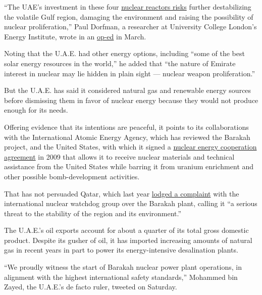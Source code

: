 ``The UAE's investment in these four
\href{https://www.nuclearconsult.com/wp/wp-content/uploads/2019/12/Gulf-Nuclear-Ambition-NCG-Dec-2019.pdf}{nuclear
reactors risks} further destabilizing the volatile Gulf region, damaging
the environment and raising the possibility of nuclear proliferation,''
Paul Dorfman, a researcher at University College London's Energy
Institute, wrote in an
\href{https://www.ucl.ac.uk/news/2020/mar/opinion-why-uae-about-open-four-nuclear-reactors}{op-ed}
in March.

Noting that the U.A.E. had other energy options, including ``some of the
best solar energy resources in the world,'' he added that ``the nature
of Emirate interest in nuclear may lie hidden in plain sight --- nuclear
weapon proliferation.''

But the U.A.E. has said it considered natural gas and renewable energy
sources before dismissing them in favor of nuclear energy because they
would not produce enough for its needs.

Offering evidence that its intentions are peaceful, it points to its
collaborations with the International Atomic Energy Agency, which has
reviewed the Barakah project, and the United States, with which it
signed a
\href{https://www.reuters.com/article/us-saudi-nuclear-usa/u-s-tells-saudi-arabia-nuclear-push-depends-on-snap-inspections-deal-idUSKBN1W2245}{nuclear
energy cooperation agreement} in 2009 that allows it to receive nuclear
materials and technical assistance from the United States while barring
it from uranium enrichment and other possible bomb-development
activities.

That has not persuaded Qatar, which last year
\href{https://www.reuters.com/article/us-qatar-emirates-nuclearpower-exclusive/exclusive-qatar-asks-iaea-to-intervene-over-threat-posed-by-uae-nuclear-plant-idUSKCN1R120L}{lodged
a complaint} with the international nuclear watchdog group over the
Barakah plant, calling it ``a serious threat to the stability of the
region and its environment.''

The U.A.E.'s oil exports account for about a quarter of its total gross
domestic product. Despite its gusher of oil, it has imported increasing
amounts of natural gas in recent years in part to power its
energy-intensive desalination plants.

``We proudly witness the start of Barakah nuclear power plant
operations, in alignment with the highest international safety
standards,'' Mohammed bin Zayed, the U.A.E.'s de facto ruler, tweeted on
Saturday.

